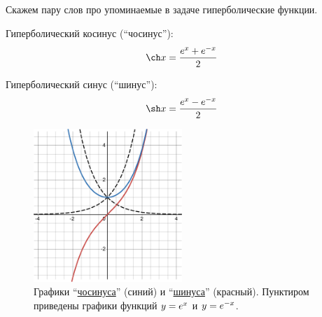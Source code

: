 \documentclass[a4paper,12pt]{article}
\begin{document}
  \begin{remark}    
    Скажем пару слов про упоминаемые в задаче гиперболические функции.

    Гиперболический косинус (``чосинус''):
    \[
      \ch x = \frac{e^x + e^{-x}}{2}
    \]
    
    Гиперболический синус (``шинус''):
    \[
      \sh x = \frac{e^x - e^{-x}}{2}
    \]

    
    \begin{figure}
      \centering
    
      \includegraphics[width=0.5\textwidth]{images/ch-x-sh-x}
    
      \caption{
        Графики ``\href{https://commons.wikimedia.org/wiki/File:Hyperbolic_and_exponential;_cosh.svg}{чосинуса}'' (синий) и ``\href{https://commons.wikimedia.org/wiki/File:Hyperbolic_and_exponential;_sinh.svg}{шинуса}'' (красный).
        Пунктиром приведены графики функций $y \hm= e^x$ и $y \hm= e^{-x}$.
      }
      \label{fig:ch-x-sh-x}
    \end{figure}


\end{remark}
\end{document}
